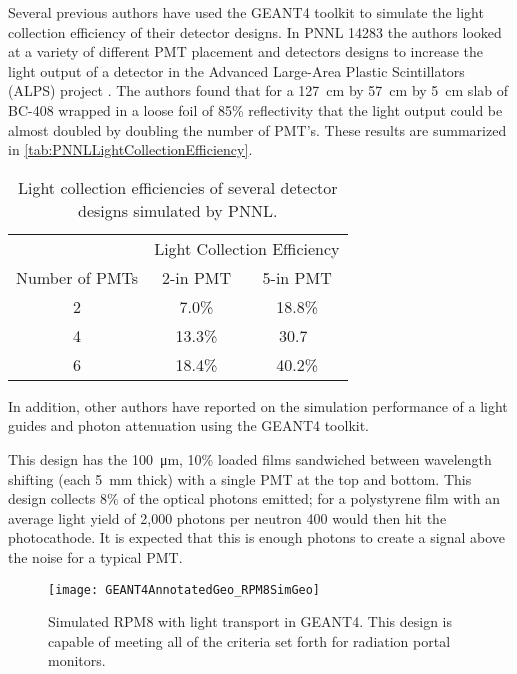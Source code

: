 Several previous authors have used the GEANT4 toolkit to simulate the light collection efficiency of their detector designs.
In PNNL 14283 the authors looked at a variety of different PMT placement and detectors designs to increase the light output of a detector in the Advanced Large-Area Plastic Scintillators (ALPS) project \cite{pnnl_14283}.
The authors found that for a \SI{127}{\cm} by \SI{57}{\cm} by \SI{5}{\cm} slab of BC-408 wrapped in a loose foil of 85\% reflectivity that the light output could be almost doubled by doubling the number of PMT's.
These results are summarized in \autoref{tab:PNNLLightCollectionEfficiency}.
\begin{table}
  \centering
  \caption[PNNL Light Collection Efficiencies]{Light collection efficiencies of several detector designs simulated by PNNL\cite{pnnl_14283}.}
  \label{tab:PNNLLightCollectionEfficiency}
  \begin{tabular}{c|c c}
  \toprule
  & \multicolumn{2}{c}{Light Collection Efficiency} \\
  Number of PMTs  & 2-in PMT & 5-in PMT \\
  \midrule
  2 & 7.0\% & 18.8\% \\
  4 & 13.3\% & 30.7\ \\
  6 & 18.4\% & 40.2\% \\
  \bottomrule
  \end{tabular}
\end{table}
In addition, other authors have reported on the simulation performance of a light guides and photon attenuation using the GEANT4 toolkit.

This design has the \SI{100}{\um}, 10\% loaded  films sandwiched between wavelength shifting (each \SI{5}{\mm} thick) with a single PMT at the top and bottom.
This design collects 8\% of the optical photons emitted; for a polystyrene film with an average light yield of 2,000 photons per neutron 400 would then hit the photocathode.
It is expected that this is enough photons to create a signal above the noise for a typical PMT.
\begin{figure}
  \centering
	\texttt{[image: GEANT4AnnotatedGeo\_RPM8SimGeo]}
	  \caption[GEANT4 Simulated RPM8 Detector Design]{Simulated RPM8 with light transport in GEANT4. This design is capable of meeting all of the criteria set forth for radiation portal monitors.}
  \label{fig:G4RPM8Geo}
\end{figure}


